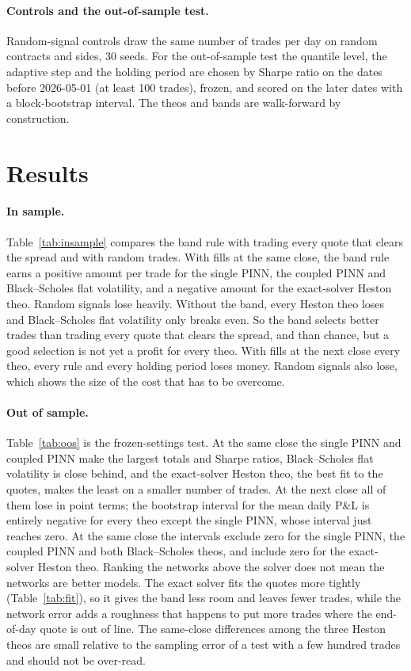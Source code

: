 \documentclass[11pt]{article}
\begin{document}
\paragraph{Controls and the out-of-sample test.}
Random-signal controls draw the same number of trades per day on random contracts and sides, 30 seeds. For the out-of-sample test the quantile level, the adaptive step and the holding period are chosen by Sharpe ratio on the dates before 2026-05-01 (at least 100 trades), frozen, and scored on the later dates with a block-bootstrap interval. The theos and bands are walk-forward by construction.

\section{Results}

\paragraph{In sample.}
Table~\ref{tab:insample} compares the band rule with trading every quote that clears the spread and with random trades. With fills at the same close, the band rule earns a positive amount per trade for the single PINN, the coupled PINN and Black--Scholes flat volatility, and a negative amount for the exact-solver Heston theo. Random signals lose heavily. Without the band, every Heston theo loses and Black--Scholes flat volatility only breaks even. So the band selects better trades than trading every quote that clears the spread, and than chance, but a good selection is not yet a profit for every theo. With fills at the next close every theo, every rule and every holding period loses money. Random signals also lose, which shows the size of the cost that has to be overcome.


\paragraph{Out of sample.}
Table~\ref{tab:oos} is the frozen-settings test. At the same close the single PINN and coupled PINN make the largest totals and Sharpe ratios, Black--Scholes flat volatility is close behind, and the exact-solver Heston theo, the best fit to the quotes, makes the least on a smaller number of trades. At the next close all of them lose in point terms; the bootstrap interval for the mean daily P\&L is entirely negative for every theo except the single PINN, whose interval just reaches zero. At the same close the intervals exclude zero for the single PINN, the coupled PINN and both Black--Scholes theos, and include zero for the exact-solver Heston theo. Ranking the networks above the solver does not mean the networks are better models. The exact solver fits the quotes more tightly (Table~\ref{tab:fit}), so it gives the band less room and leaves fewer trades, while the network error adds a roughness that happens to put more trades where the end-of-day quote is out of line. The same-close differences among the three Heston theos are small relative to the sampling error of a test with a few hundred trades and should not be over-read.
\end{document}
